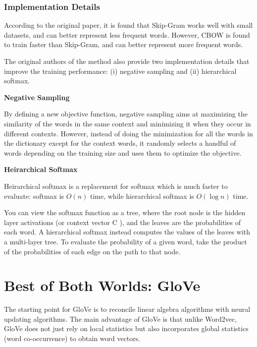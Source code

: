 \documentclass[
]{book}
\begin{document}
\hypertarget{implementation-details}{%
\subsubsection{Implementation Details}\label{implementation-details}}

According to the original paper, it is found that Skip-Gram works well with small datasets, and can better represent less frequent words. However, CBOW is found to train faster than Skip-Gram, and can better represent more frequent words.

The original authors of the method also provide two implementation details that improve the training performance: (i) negative sampling and (ii) hierarchical softmax.

\textbf{Negative Sampling}

By defining a new objective function, negative sampling aims at maximizing the similarity of the words in the same context and minimizing it when they occur in different contexts. However, instead of doing the minimization for all the words in the dictionary except for the context words, it randomly selects a handful of words depending on the training size and uses them to optimize the objective.

\textbf{Heirarchical Softmax}

Heirarchical softmax is a replacement for softmax which is much faster to evaluate: softmax is \(O(n)\) time, while hierarchical softmax is \(O(\log n)\) time.

You can view the softmax function as a tree, where the root node is the hidden layer activations (or context vector C ), and the leaves are the probabilities of each word. A hierarchical softmax instead computes the values of the leaves with a multi-layer tree. To evaluate the probability of a given word, take the product of the probabilities of each edge on the path to that node.

\hypertarget{best-of-both-worlds-glove}{%
\section{Best of Both Worlds: GloVe}\label{best-of-both-worlds-glove}}

The starting point for GloVe is to reconcile linear algebra algorithms with neural updating algorithms. The main advantage of GloVe is that unlike Word2vec, GloVe does not just rely on local statistics but also incorporates global statistics (word co-occurrence) to obtain word vectors.
\end{document}
